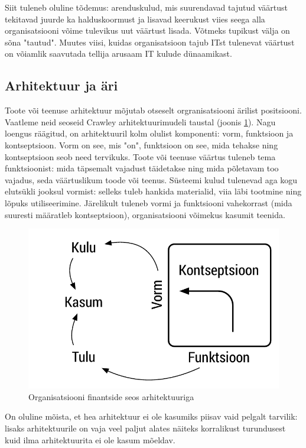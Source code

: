 \documentclass{article}
\begin{document}
Siit tuleneb oluline tõdemus: arenduskulud, mis suurendavad tajutud väärtust tekitavad juurde ka halduskoormust ja lisavad keerukust viies seega alla organisatsiooni võime tulevikus uut väärtust lisada. Võtmeks tupikust välja on sõna "tautud". Muutes viisi, kuidas organisatsioon tajub ITst tulenevat väärtust on võiamlik saavutada tellija arusaam IT kulude dünaamikast. 

\subsection{Arhitektuur ja äri}
Toote või teenuse arhitektuur mõjutab otseselt orgranisatsiooni ärilist positsiooni. Vaatleme neid seoseid Crawley arhitektuurimudeli taustal (joonis \ref{fig:arh}). Nagu loengus räägitud, on arhitektuuril kolm olulist komponenti: vorm, funktsioon ja kontseptsioon. Vorm on see, mis "on", funktsioon on see, mida tehakse ning kontseptsioon seob need tervikuks. Toote või teenuse väärtus tuleneb tema funktsioonist: mida täpsemalt vajadust täidetakse ning mida põletavam too vajadus, seda väärtuslikum toode või teenus. Süsteemi kulud tulenevad aga kogu elutsükli jooksul vormist: selleks tuleb hankida materialid, viia läbi tootmine ning lõpuks utiliseerimine. Järelikult tuleneb vormi ja funktsiooni vahekorrast (mida suuresti määratleb kontseptsioon), organisatsiooni võimekus kasumit teenida.

\begin{figure}[htp]
	\begin{center}
		\includegraphics[width=.6\textwidth]{ffc_profit.pdf}
		\caption{Organisatsiooni finantside seos arhitektuuriga}
		\label{fig:arh}
	\end{center}
\end{figure}


On oluline mõista, et hea arhitektuur ei ole kasumiks piisav vaid pelgalt tarvilik: lisaks arhitektuurile on vaja veel paljut alates näiteks korralikust turundusest kuid ilma arhitektuurita ei ole kasum mõeldav. 
\end{document}
